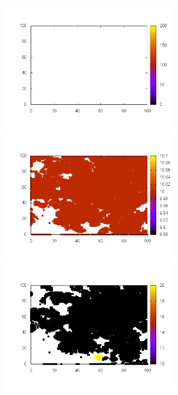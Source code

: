 \documentclass[10pt,a4paper]{article}
\begin{document}
\begin{figure}
\begin{subfigure}[b]{1\textwidth}
\includegraphics[scale=.3]{./img/stampe/scc1/6.png}
\includegraphics[scale=.3]{./img/stampe/scc1/7.png}
\includegraphics[scale=.3]{./img/stampe/scc1/8.png}

\end{subfigure}
\end{figure}
\end{document}
